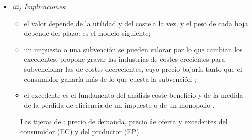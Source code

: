 \documentclass[11pt]{article}
\begin{document}
\begin{itemize}
\begin{itemize}
\begin{itemize}
    \end{itemize}
  \item \emph{La empresa representativa}: las empresas nacen, crecen y decaen como los árboles de un bosque, aunque el bosque siga igual. Por eso el coste de la industria no es el de la mayor ni el de la más nueva, sino el de una empresa de tamaño y éxito normales.
  \item \emph{El equilibrio}: la cantidad en la que coinciden el precio de demanda y el de oferta, $p^D(q^*)=p^S(q^*)=p^*$ (gráfico~\ref{fig:marshall-tijeras}).
  \item \emph{Los excedentes}: el  (EC), lo que se estaría dispuesto a pagar por encima de lo que se paga, es el área bajo la demanda y sobre el precio, y el del productor (EP), la que hay sobre la oferta y bajo el precio\nocite{Marshall1890Principles}:
  \begin{equation}
  \mathrm{EC}=\int_0^{q^*}p^D(s)\,ds-p^*q^*,\qquad \mathrm{EP}=p^*q^*-\int_0^{q^*}p^S(s)\,ds. \label{eq:excedentes}
  \end{equation}
  Con la utilidad marginal del dinero constante, el EC mide en dinero la ganancia de bienestar. Recoge la medida que  usaba para valorar las obras públicas (\ref{sec:precursores}).
  \end{itemize}
\item \emph{iii) Implicaciones}:
  \begin{itemize}
  \item el valor depende de la utilidad y del coste a la vez, y el peso de cada hoja depende del plazo: es el modelo siguiente;
  \item un impuesto o una subvención se pueden valorar por lo que cambian los excedentes.  propone gravar las industrias de costes crecientes para subvencionar las de costes decrecientes, cuyo precio bajaría tanto que el consumidor ganaría más de lo que cuesta la subvención\nocite{Marshall1890Principles} ;
  \item el excedente es el fundamento del análisis coste-beneficio y de la medida de la pérdida de eficiencia de un impuesto o de un monopolio .
  \end{itemize}
\end{itemize}

\begin{figure}[H]
\centering
\caption{Las tijeras de : precio de demanda, precio de oferta y excedentes del consumidor (EC) y del productor (EP)}\label{fig:marshall-tijeras}
\end{figure}
\end{document}
